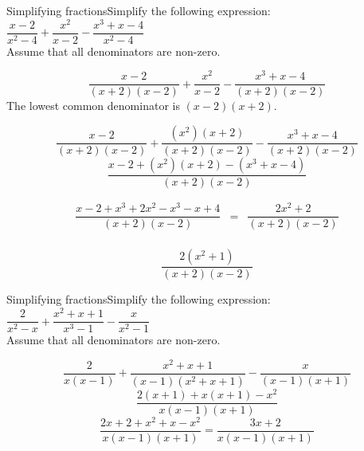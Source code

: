 %      
\begin{wex}{Simplifying fractions}{Simplify the following expression: $\dfrac{x-2}{{x}^{2}-4}+\dfrac{{x}^{2}}{x-2}-\dfrac{{x}^{3}+x-4}{{x}^{2}-4}$ \\
Assume that all denominators are non-zero.}
{
\begin{equation*}
\frac{x-2}{\left(x+2\right)\left(x-2\right)}+\frac{{x}^{2}}{x-2}-\frac{{x}^{3}+x-4}{\left(x+2\right)\left(x-2\right)}
\end{equation*}
 The lowest common denominator is $\left(x-2\right)\left(x+2\right)$.\par 
\label{m39392*id27943653977}\nopagebreak\noindent{}
\begin{equation*}
\frac{x-2}{\left(x+2\right)\left(x-2\right)}+\frac{\left({x}^{2}\right)
\left(x+2\right)}{\left(x+2\right)\left(x-2\right)}-\frac{{x}^{3}+x-4}{\left(x+2\right)\left(x-2\right)}
\end{equation*}
\begin{equation*}
\frac{x-2+({x}^{2})(x+2)-(x^{3}+x-4)}{(x+2)(x-2)}
\end{equation*}

\begin{equation*}
 \begin{array}{llll}
\dfrac{x-2+{x}^{3}+ 2x^{2}-x^{3} - x+4}{(x+2)(x-2)} & = & \dfrac{2x^{2} + 2}{(x+2)(x-2)}\\
\end{array}
\end{equation*}

\begin{equation*}
\dfrac{2\left({x}^{2}
+1\right)}{\left(x+2\right)\left(x-2\right)}
\end{equation*}
}
\end{wex}

\begin{wex}{Simplifying fractions}{Simplify the following expression: $\dfrac{2}{{x}^{2}-x}+\dfrac{x^{2}+x+1}{x^{3}-1}-\dfrac{x}{{x}^{2}-1}$ \\
Assume that all denominators are non-zero.}
{
\begin{equation*}
\dfrac{2}{x(x-1)}+ \dfrac{{x}^{2} + x + 1}{(x-1)(x^{2}+x+1)}-\dfrac{x}{(x-1)(x+1)}
\end{equation*}
\begin{equation*}
\dfrac{2(x+1)+x(x+1)-x^{2}}{x(x-1)(x+1)}
\end{equation*}
\begin{equation*}
\dfrac{2x+2 + x^{2} + x - x^{2}}{x(x-1)(x+1)} = \dfrac{3x+2}{x(x-1)(x+1)}
\end{equation*}



}
\end{wex}


